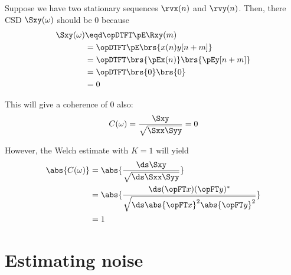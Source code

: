 \begin{example}[The K=1 Welch estimate of coherence]
Suppose we have two  stationary sequences $\rvx(n)$ and $\rvy(n)$. Then, there
CSD $\Sxy(\omega)$ should be $0$ because
\begin{align*}
  \Sxy(\omega)
    &\eqd \opDTFT\pE\Rxy(m)
  \\&=    \opDTFT\pE\brs{x(n)y[n+m]}
  \\&=    \opDTFT\brs{\pEx(n)} \brs{\pEy[n+m]}
  \\&=    \opDTFT\brs{0} \brs{0}
  \\&=    0
\end{align*}

This will give a coherence of $0$ also:
\[ C(\omega) = \frac{\Sxy}{\sqrt{\Sxx\Syy}} = 0\]

However, the Welch estimate with $K=1$ will yield
\begin{align*}
  \abs{C(\omega)}
    &= \abs{\frac{\ds\Sxy}{\sqrt{\ds\Sxx\Syy}}}
  \\&= \abs{\frac{\ds (\opFT x)(\opFT y)^\ast}{\sqrt{\ds\abs{\opFT x}^2\abs{\opFT y}^2}}}
  \\&= 1
\end{align*}

\end{example}


\section{Estimating noise}

\begin{liste}
  \item {}
  \item {}
  \item {}
\end{liste}